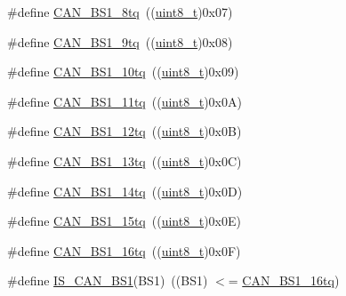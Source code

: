 \begin{DoxyCompactItemize}
\item 
\#define \hyperlink{group___c_a_n__time__quantum__in__bit__segment__1_ga1049ea9bc5b3da680574ca444e888de4}{C\+A\+N\+\_\+\+B\+S1\+\_\+8tq}~((\hyperlink{_p_e___types_8h_aba7bc1797add20fe3efdf37ced1182c5}{uint8\+\_\+t})0x07)
\item 
\#define \hyperlink{group___c_a_n__time__quantum__in__bit__segment__1_ga0493701bdd73a9649510f035439a6580}{C\+A\+N\+\_\+\+B\+S1\+\_\+9tq}~((\hyperlink{_p_e___types_8h_aba7bc1797add20fe3efdf37ced1182c5}{uint8\+\_\+t})0x08)
\item 
\#define \hyperlink{group___c_a_n__time__quantum__in__bit__segment__1_gaf1b474aa632787e70bedd0c5dfdbf5ed}{C\+A\+N\+\_\+\+B\+S1\+\_\+10tq}~((\hyperlink{_p_e___types_8h_aba7bc1797add20fe3efdf37ced1182c5}{uint8\+\_\+t})0x09)
\item 
\#define \hyperlink{group___c_a_n__time__quantum__in__bit__segment__1_ga4f765ffbe7fda4fb6d0fde7bc4058a14}{C\+A\+N\+\_\+\+B\+S1\+\_\+11tq}~((\hyperlink{_p_e___types_8h_aba7bc1797add20fe3efdf37ced1182c5}{uint8\+\_\+t})0x0\+A)
\item 
\#define \hyperlink{group___c_a_n__time__quantum__in__bit__segment__1_ga14c4e928f615babc14c6a9e80ee86a6c}{C\+A\+N\+\_\+\+B\+S1\+\_\+12tq}~((\hyperlink{_p_e___types_8h_aba7bc1797add20fe3efdf37ced1182c5}{uint8\+\_\+t})0x0\+B)
\item 
\#define \hyperlink{group___c_a_n__time__quantum__in__bit__segment__1_ga2087caec94be44837c1e6965da7f6236}{C\+A\+N\+\_\+\+B\+S1\+\_\+13tq}~((\hyperlink{_p_e___types_8h_aba7bc1797add20fe3efdf37ced1182c5}{uint8\+\_\+t})0x0\+C)
\item 
\#define \hyperlink{group___c_a_n__time__quantum__in__bit__segment__1_gac0c71e1020a4fbaf66bce754bd54d8cb}{C\+A\+N\+\_\+\+B\+S1\+\_\+14tq}~((\hyperlink{_p_e___types_8h_aba7bc1797add20fe3efdf37ced1182c5}{uint8\+\_\+t})0x0\+D)
\item 
\#define \hyperlink{group___c_a_n__time__quantum__in__bit__segment__1_gaa52c8674dc7caae1089e5276cd13db5f}{C\+A\+N\+\_\+\+B\+S1\+\_\+15tq}~((\hyperlink{_p_e___types_8h_aba7bc1797add20fe3efdf37ced1182c5}{uint8\+\_\+t})0x0\+E)
\item 
\#define \hyperlink{group___c_a_n__time__quantum__in__bit__segment__1_ga3be52c699f5618cc318c143ee42f5966}{C\+A\+N\+\_\+\+B\+S1\+\_\+16tq}~((\hyperlink{_p_e___types_8h_aba7bc1797add20fe3efdf37ced1182c5}{uint8\+\_\+t})0x0\+F)
\item 
\#define \hyperlink{group___c_a_n__time__quantum__in__bit__segment__1_ga225f1457e1c6b8fc3b5af0f463933152}{I\+S\+\_\+\+C\+A\+N\+\_\+\+B\+S1}(B\+S1)~((B\+S1) $<$= \hyperlink{openmotestm_2library_2inc_2stm32f10x__can_8h_a3be52c699f5618cc318c143ee42f5966}{C\+A\+N\+\_\+\+B\+S1\+\_\+16tq})

\end{DoxyCompactItemize}

